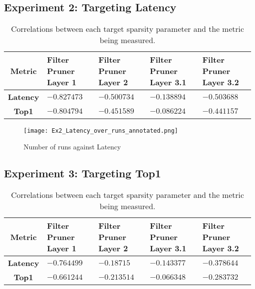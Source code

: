 \documentclass[../Dissertation.tex]{subfiles}
\begin{document}
\subsection{Experiment 2: Targeting Latency}

\singlespacing
\begin{table}[H]
    \centering
    \begin{tabular}{@{}cp{26mm}p{26mm}p{26mm}p{26mm}@{}}
    \toprule
    \textbf{Metric}  & \textbf{Filter Pruner  Layer 1} & \textbf{Filter Pruner Layer 2} & \textbf{Filter Pruner Layer 3.1} & \textbf{Filter Pruner Layer 3.2} \\ \midrule
    \textbf{Latency} & $-0.827473$                        & $-0.500734$                      & $-0.138894$                         & $-0.503688$                         \\
    \textbf{Top1}    & $-0.804794$                        & $-0.451589$                      & $-0.086224$                        & $-0.441157$                        \\ \bottomrule
    \end{tabular}
    \caption{Correlations between each target sparsity parameter and the metric being measured.}
    \label{tab:Ex2PruneCorrelations}
\end{table}
\doublespacing

\begin{figure}[H]
    \centering
    \texttt{[image: Ex2\_Latency\_over\_runs\_annotated.png]}
    \caption{Number of runs against Latency}
\end{figure}

\subsection{Experiment 3: Targeting Top1}

\singlespacing
\begin{table}[H]
    \centering
    \begin{tabular}{@{}cp{26mm}p{26mm}p{26mm}p{26mm}@{}}
    \toprule
    \textbf{Metric}  & \textbf{Filter Pruner  Layer 1} & \textbf{Filter Pruner Layer 2} & \textbf{Filter Pruner Layer 3.1} & \textbf{Filter Pruner Layer 3.2} \\ \midrule
    \textbf{Latency} & $-0.764499$                        & $-0.18715$                      & $-0.143377$                         & $-0.378644$                         \\
    \textbf{Top1}    & $-0.661244$                        & $-0.213514$                      & $-0.066348$                        & $-0.283732$                        \\ \bottomrule
    \end{tabular}
    \caption{Correlations between each target sparsity parameter and the metric being measured.}
    \label{tab:Ex3PruneCorrelations}
\end{table}
\doublespacing
\end{document}
